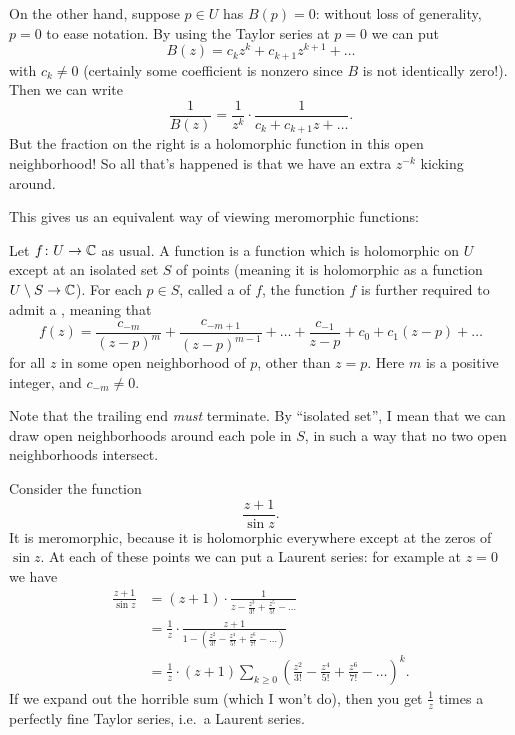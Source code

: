 On the other hand, suppose $p \in U$ has $B(p) = 0$: without loss of generality, $p=0$
to ease notation.
By using the Taylor series at $p=0$ we can put
\[ B(z) = c_k z^k + c_{k+1} z^{k+1} + \dots \]
with $c_k \neq 0$
(certainly some coefficient is nonzero since $B$ is not identically zero!).
Then we can write
\[ \frac{1}{B(z)} = \frac{1}{z^k} \cdot \frac{1}{c_k + c_{k+1}z + \dots}. \]
But the fraction on the right is a
holomorphic function in this open neighborhood!
So all that's happened is that we have an extra $z^{-k}$ kicking around.


This gives us an equivalent way of viewing meromorphic functions:

\begin{definition}
	Let $f \colon U \to \mathbb C$ as usual.
	A  function is a function which is holomorphic on $U$
	except at an isolated set $S$ of points
	(meaning it is holomorphic as a function $U \setminus S \to \mathbb C$).
	For each $p \in S$, called a  of $f$,
	the function $f$ is further required to admit a , meaning that
	\[
		f(z) =
		\frac{c_{-m}}{(z-p)^m}
		+ \frac{c_{-m+1}}{(z-p)^{m-1}}
		+ \dots
		+ \frac{c_{-1}}{z-p} + c_0 + c_1 (z-p) + \dots
	\]
	for all $z$ in some open neighborhood of $p$, other than $z = p$.
	Here $m$ is a positive integer, and $c_{-m} \neq 0$.
\end{definition}
Note that the trailing end \emph{must} terminate.
By ``isolated set'', I mean that we can draw
open neighborhoods around each pole in $S$,
in such a way that no two open neighborhoods intersect.

\begin{example}
	Consider the function \[ \frac{z+1}{\sin z}. \]
	It is meromorphic, because it is holomorphic everywhere except at the zeros of $\sin z$.
	At each of these points we can put a Laurent series: for example at $z=0$ we have
	\begin{align*}
		\frac{z+1}{\sin z}
		&= (z+1) \cdot \frac{1}{z - \frac{z^3}{3!} + \frac{z^5}{5!} - \dots} \\
		&= \frac 1z \cdot \frac{z+1}{1 - \left(%
			\frac{z^2}{3!} - \frac{z^4}{5!} + \frac{z^6}{7!} - \dots \right)} \\
		&= \frac 1z \cdot (z+1) \sum_{k \ge 0} \left( %
			\frac{z^2}{3!}-\frac{z^4}{5!}+\frac{z^6}{7!}-\dots \right)^k.
	\end{align*}
	If we expand out the horrible sum (which I won't do),
	then you get $\frac 1z$ times a perfectly
	fine Taylor series, i.e.\ a Laurent series.
\end{example}

